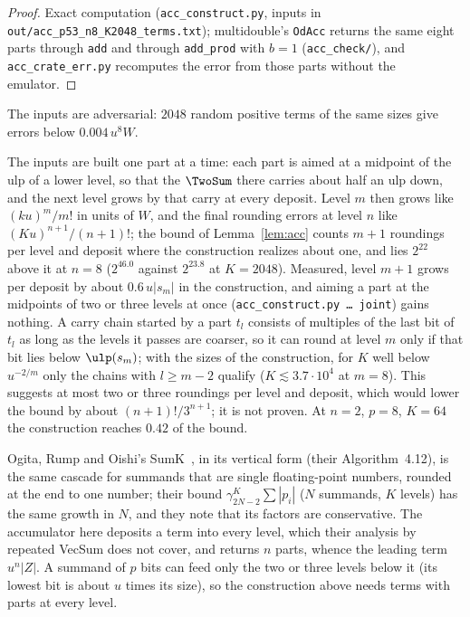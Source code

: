\begin{proof}
Exact computation (\texttt{acc\_construct.py}, inputs in \texttt{out/acc\_p53\_n8\_K2048\_terms.txt}); multidouble's
\texttt{OdAcc} returns the same eight parts through \texttt{add} and through \texttt{add\_prod} with $b = 1$
(\texttt{acc\_check/}), and \texttt{acc\_crate\_err.py} recomputes the error from those parts without the emulator.
\end{proof}

The inputs are adversarial: $2048$ random positive terms of the same sizes give errors below $0.004\,u^8W$.

\begin{remark}
The inputs are built one part at a time: each part is aimed at a midpoint of the ulp of a lower level, so that the
$\TwoSum$ there carries about half an ulp down, and the next level grows by that carry at every deposit. Level $m$
then grows like $(ku)^m/m!$ in units of $W$, and the final rounding errors at level $n$ like $(Ku)^{n+1}/(n+1)!$; the
bound of Lemma~\ref{lem:acc} counts $m+1$ roundings per level and deposit where the construction realizes about one, and
lies $2^{22}$ above it at $n = 8$ ($2^{46.0}$ against $2^{23.8}$ at $K = 2048$). Measured, level $m+1$ grows per
deposit by about $0.6\,u|s_m|$ in the construction, and aiming a part at the midpoints of two or three levels at once
(\texttt{acc\_construct.py \dots\ joint}) gains nothing. A carry chain started by a part $t_l$ consists of multiples of
the last bit of $t_l$ as long as the levels it passes are coarser, so it can round at level $m$ only if that bit lies
below $\ulp(s_m)$; with the sizes of the construction, for $K$ well below $u^{-2/m}$ only the chains with $l \ge m -
2$ qualify ($K \lesssim 3.7 \cdot 10^4$ at $m = 8$). This suggests at most two
or three roundings per level and deposit, which would lower the bound by about $(n+1)!/3^{n+1}$; it is not proven. At
$n = 2$, $p = 8$, $K = 64$ the construction reaches $0.42$ of the bound.

Ogita, Rump and Oishi's SumK~\cite{ORO05}, in its vertical form (their Algorithm~4.12), is the same cascade for summands
that are single floating-point numbers, rounded at the end to one number; their bound $\gamma_{2N-2}^{K}\sum|p_i|$
($N$ summands, $K$ levels) has the same growth in $N$, and they note that its factors are conservative. The
accumulator here deposits a term into every level, which their analysis by repeated VecSum does not cover, and returns
$n$ parts, whence the leading term $u^n|Z|$. A summand of $p$ bits can feed only the two or three levels below it
(its lowest bit is about $u$ times its size), so the construction above needs terms with parts at every level.
\end{remark}
